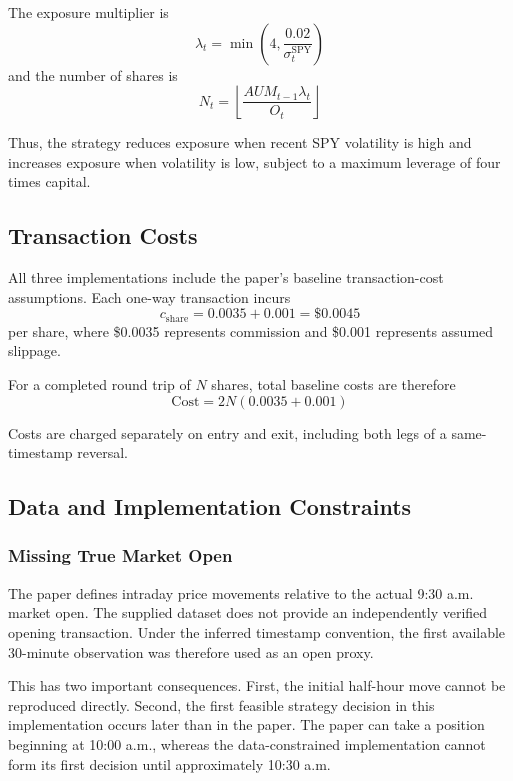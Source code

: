 \documentclass{article}
\begin{document}
The exposure multiplier is
\begin{equation}
    \lambda_t
    =
    \min
    \left(
    4,
    \frac{0.02}{\sigma^{\text{SPY}}_t}
    \right)
\end{equation}
and the number of shares is
\begin{equation}
    N_t
    =
    \left\lfloor
    \frac{AUM_{t-1}\lambda_t}{O_t}
    \right\rfloor
\end{equation}

Thus, the strategy reduces exposure when recent SPY volatility is high and increases exposure when volatility is low, subject to a maximum leverage of four times capital.

\subsection{Transaction Costs}

All three implementations include the paper's baseline transaction-cost assumptions. Each one-way transaction incurs
\begin{equation}
    c_{\text{share}}
    =
    0.0035 + 0.001
    =
    \$0.0045
\end{equation}
per share, where \$0.0035 represents commission and \$0.001 represents assumed slippage.

For a completed round trip of $N$ shares, total baseline costs are therefore
\begin{equation}
    \text{Cost}
    =
    2N(0.0035+0.001)
\end{equation}

Costs are charged separately on entry and exit, including both legs of a same-timestamp reversal.

\subsection{Data and Implementation Constraints}
\subsubsection{Missing True Market Open}

The paper defines intraday price movements relative to the actual 9:30 a.m. market open. The supplied dataset does not provide an independently verified opening transaction. Under the inferred timestamp convention, the first available 30-minute observation was therefore used as an open proxy.

This has two important consequences. First, the initial half-hour move cannot be reproduced directly. Second, the first feasible strategy decision in this implementation occurs later than in the paper. The paper can take a position beginning at 10:00 a.m., whereas the data-constrained implementation cannot form its first decision until approximately 10:30 a.m.
\end{document}
